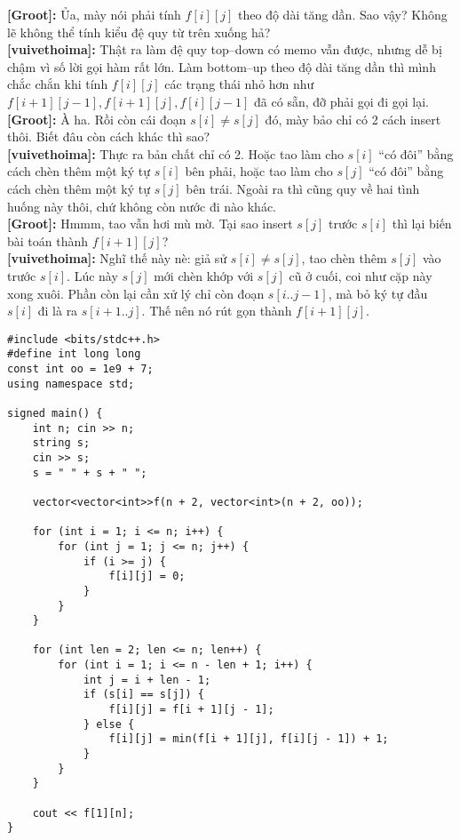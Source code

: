 \textbf{[Groot]:} Ủa, mày nói phải tính $f[i][j]$ theo độ dài tăng dần. 
Sao vậy? Không lẽ không thể tính kiểu đệ quy từ trên xuống hả?\\

\textbf{[vuivethoima]:} Thật ra làm đệ quy top–down có memo vẫn được, 
nhưng dễ bị chậm vì số lời gọi hàm rất lớn. 
Làm bottom–up theo độ dài tăng dần thì mình chắc chắn khi tính $f[i][j]$ 
các trạng thái nhỏ hơn như $f[i+1][j-1], f[i+1][j], f[i][j-1]$ đã có sẵn, 
đỡ phải gọi đi gọi lại.\\

\textbf{[Groot]:} À ha. Rồi còn cái đoạn $s[i] \neq s[j]$ đó, 
mày bảo chỉ có 2 cách insert thôi. Biết đâu còn cách khác thì sao?\\

\textbf{[vuivethoima]:} Thực ra bản chất chỉ có 2. 
Hoặc tao làm cho $s[i]$ “có đôi” bằng cách chèn thêm một ký tự $s[i]$ bên phải, 
hoặc tao làm cho $s[j]$ “có đôi” bằng cách chèn thêm một ký tự $s[j]$ bên trái. 
Ngoài ra thì cũng quy về hai tình huống này thôi, 
chứ không còn nước đi nào khác.\\

\textbf{[Groot]:} Hmmm, tao vẫn hơi mù mờ. 
Tại sao insert $s[j]$ trước $s[i]$ thì lại biến bài toán thành $f[i+1][j]$?\\

\textbf{[vuivethoima]:} Nghĩ thế này nè: 
giả sử $s[i] \neq s[j]$, tao chèn thêm $s[j]$ vào trước $s[i]$. 
Lúc này $s[j]$ mới chèn khớp với $s[j]$ cũ ở cuối, 
coi như cặp này xong xuôi. 
Phần còn lại cần xử lý chỉ còn đoạn $s[i..j-1]$, 
mà bỏ ký tự đầu $s[i]$ đi là ra $s[i+1..j]$. 
Thế nên nó rút gọn thành $f[i+1][j]$.\\

\begin{lstlisting}[title=\centering \textbf{Cài đặt}]
#include <bits/stdc++.h>
#define int long long
const int oo = 1e9 + 7;
using namespace std;

signed main() {
    int n; cin >> n;
    string s;
    cin >> s;
    s = " " + s + " ";

    vector<vector<int>>f(n + 2, vector<int>(n + 2, oo));

    for (int i = 1; i <= n; i++) {
        for (int j = 1; j <= n; j++) {
            if (i >= j) {
                f[i][j] = 0;
            } 
        }
    }

    for (int len = 2; len <= n; len++) {
        for (int i = 1; i <= n - len + 1; i++) {
            int j = i + len - 1;
            if (s[i] == s[j]) {
                f[i][j] = f[i + 1][j - 1];
            } else {
                f[i][j] = min(f[i + 1][j], f[i][j - 1]) + 1;
            }
        }
    }

    cout << f[1][n];
}
\end{lstlisting}

